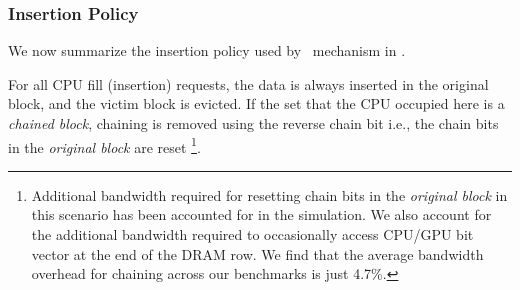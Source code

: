 \subsubsection{Insertion Policy}
\par We now summarize the insertion policy used by \chaining\ mechanism in \cachename. 
\par For all CPU fill (insertion) requests, the data is always inserted in the original block, and the victim block is evicted. If the set that the CPU occupied  here is a \textit{chained block}, chaining is removed using the reverse chain bit i.e., the chain bits in the \textit{original block} are reset
\footnote{Additional bandwidth required for resetting chain bits in the \textit{original block} in this scenario has been accounted for in the simulation. We also account for the additional bandwidth required to occasionally access CPU/GPU bit vector at the end of the DRAM row. We find that the average bandwidth overhead for chaining across our benchmarks is just 4.7\%.}.
